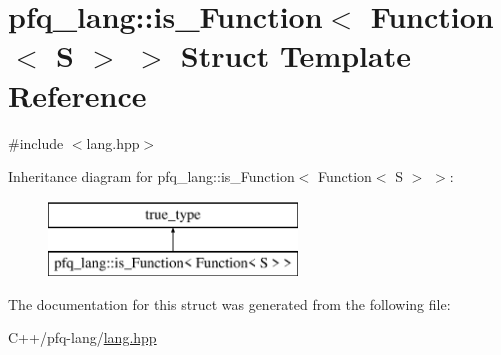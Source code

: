 \hypertarget{structpfq__lang_1_1is__Function_3_01Function_3_01S_01_4_01_4}{\section{pfq\+\_\+lang\+:\+:is\+\_\+\+Function$<$ Function$<$ S $>$ $>$ Struct Template Reference}
\label{structpfq__lang_1_1is__Function_3_01Function_3_01S_01_4_01_4}
}


{\ttfamily \#include $<$lang.\+hpp$>$}

Inheritance diagram for pfq\+\_\+lang\+:\+:is\+\_\+\+Function$<$ Function$<$ S $>$ $>$\+:\begin{figure}[H]
\begin{center}
\leavevmode
\includegraphics[height=2.000000cm]{structpfq__lang_1_1is__Function_3_01Function_3_01S_01_4_01_4}
\end{center}
\end{figure}


The documentation for this struct was generated from the following file\+:\begin{DoxyCompactItemize}
\item 
C++/pfq-\/lang/\hyperlink{lang_8hpp}{lang.\+hpp}\end{DoxyCompactItemize}

